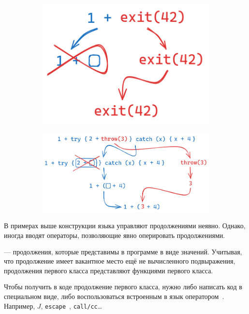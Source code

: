 \begin{figure}[h]
    \centering
    \begin{subfigure}[h]{0.29\linewidth}
        \includegraphics[width=1\textwidth]{figs/cont-exit}
    \end{subfigure}
    \begin{subfigure}[h]{0.7\linewidth}
        \includegraphics[width=1\textwidth]{figs/cont-try-catch}
    \end{subfigure}
\end{figure}

В примерах выше конструкции языка управляют продолжениями неявно.
Однако, иногда вводят операторы, позволяющие явно оперировать продолжениями.

 --- продолжения, которые представимы в программе в виде значений.
Учитывая, что продолжение имеет вакантное место ещё не вычисленного подвыражения, продолжения первого класса представляют функциями первого класса.

Чтобы получить в коде продолжение первого класса, нужно либо написать код в специальном виде, либо воспользоваться встроенным в язык оператором~\cite[приложение A]{hillerstrom2022foundations}.
Например, $J$, \texttt{escape}~\cite{reynolds1972definitional}, \texttt{call/cc}\ldots %

